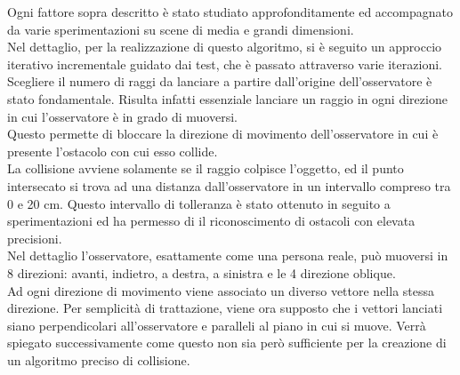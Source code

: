 Ogni fattore sopra descritto è stato studiato approfonditamente ed accompagnato da varie sperimentazioni su scene di media e grandi dimensioni.
\\
Nel dettaglio, per la realizzazione di questo algoritmo, si è seguito un approccio iterativo incrementale guidato dai test, che è passato attraverso varie iterazioni.
Scegliere il numero di raggi da lanciare a partire dall’origine dell’osservatore è stato fondamentale. Risulta infatti essenziale lanciare un raggio in ogni direzione in cui l’osservatore è in grado di muoversi.
\\
Questo permette di bloccare la direzione di movimento dell’osservatore in cui è presente l’ostacolo con cui esso collide.
\\
La collisione avviene solamente se il raggio colpisce l’oggetto, ed il punto intersecato si trova ad una distanza dall’osservatore in un intervallo compreso tra 0 e 20 cm. 
Questo intervallo di tolleranza è stato ottenuto in seguito a sperimentazioni ed ha permesso di il riconoscimento di ostacoli con elevata precisioni.
\\
Nel dettaglio l’osservatore, esattamente come una persona reale, può muoversi in 8 direzioni: avanti, indietro, a destra, a sinistra e le 4 direzione oblique.
\\
Ad ogni direzione di movimento viene associato un diverso vettore nella stessa direzione.
Per semplicità di trattazione, viene ora supposto che i vettori lanciati siano perpendicolari all’osservatore e paralleli al piano in cui si muove. Verrà spiegato successivamente come questo non sia però sufficiente per la creazione di un algoritmo preciso di collisione.





